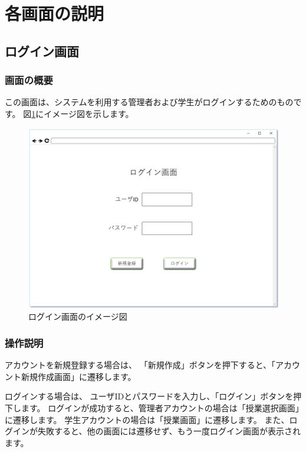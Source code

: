\section{各画面の説明}
\subsection{ログイン画面}
\subsubsection{画面の概要}
この画面は、システムを利用する管理者および学生がログインするためのものです。
図\ref{fig:sc_login}にイメージ図を示します。

\begin{figure}[htbp]
  \begin{center}
    \includegraphics[width=1\linewidth,clip]{./img/sc_login.png}
    \caption{ログイン画面のイメージ図}\label{fig:sc_login}
  \end{center}
\end{figure}

\subsubsection{操作説明}
アカウントを新規登録する場合は、
「新規作成」ボタンを押下すると、「アカウント新規作成画面」に遷移します。

ログインする場合は、
ユーザIDとパスワードを入力し、「ログイン」ボタンを押下します。
ログインが成功すると、管理者アカウントの場合は「授業選択画面」に遷移します。
学生アカウントの場合は「授業画面」に遷移します。
また、ログインが失敗すると、他の画面には遷移せず、もう一度ログイン画面が表示されます。

